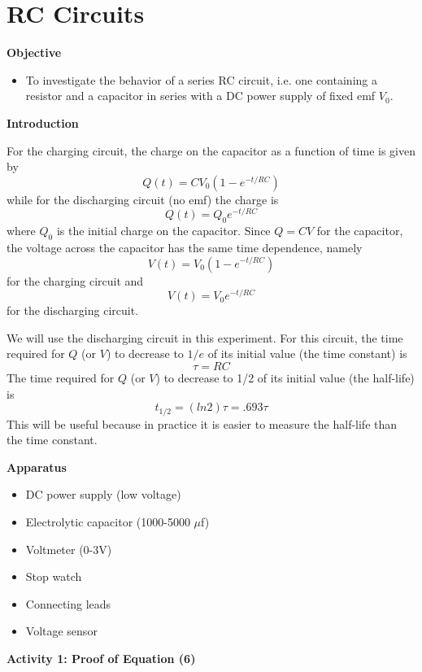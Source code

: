 \setcounter{equation}{0}

\section{RC Circuits}

\makelabheader %

\textbf{Objective}

\begin{itemize}
\item To investigate the behavior of a series RC circuit, i.e. one containing a resistor and a capacitor in series with a DC power supply of fixed emf $V_{0}$.
\end{itemize}
\textbf{Introduction} 

For the charging circuit, the charge on the capacitor as a function of time
is given by
\begin{equation}
Q(t)=CV_{0}\left(1-e^{-t/RC}\right)
\end{equation}
while for the discharging circuit (no emf) the charge is
\begin{equation}
Q(t)=Q_{0}e^{-t/RC}
\end{equation}
where $Q_{0}$ is the initial charge on the capacitor.  Since $Q=CV$ for the
capacitor, the voltage across the capacitor has the same time dependence,
namely
\begin{equation}
V(t)=V_{0}\left(1-e^{-t/RC}\right)
\end{equation}
for the charging circuit and
\begin{equation}
V(t)=V_{0}e^{-t/RC}
\end{equation}
for the discharging circuit.
\vspace{5mm}

We will use the discharging circuit in this experiment.
For this circuit, the time required for $Q$ (or $V$) to decrease to
$1/e$ of its initial value (the time constant) is
\begin{equation}
\tau=RC
\end{equation}
The time required for $Q$ (or $V$) to decrease to 1/2 of its initial value (the
half-life) is
\begin{equation}
t_{1/2}=(ln2)\tau =.693\tau
\end{equation}
This will be useful because in practice it is easier to measure the half-life
than the time constant.


\textbf{Apparatus}

\begin{itemize}
\item DC power supply (low voltage)
\item Electrolytic capacitor (1000-5000 $\mu$f)
\item Voltmeter (0-3V)
\item Stop watch
\item Connecting leads
\item Voltage sensor
\end{itemize}
\textbf{Activity 1: Proof of Equation (6)}

